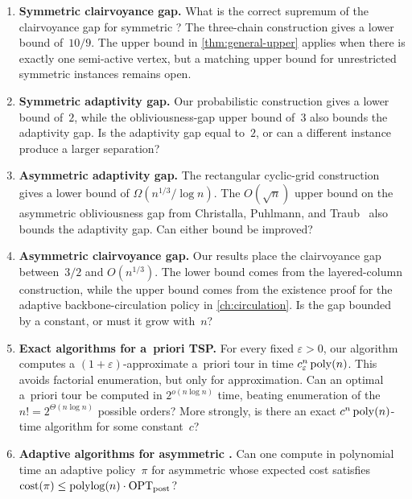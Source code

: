 \documentclass[12pt,a4paper,oneside]{report}
\begin{document}
\begin{enumerate}
    \item \textbf{Symmetric clairvoyance gap.}
    What is the correct supremum of the clairvoyance gap for symmetric \StochTSP{}?
    The three-chain construction gives a lower bound
    of~$10/9$.  The upper bound in \cref{thm:general-upper} applies when
    there is exactly one semi-active vertex, but a matching upper bound for
    unrestricted symmetric instances remains open.

    \item \textbf{Symmetric adaptivity gap.}
    Our probabilistic construction gives a lower bound of~$2$, while the
    obliviousness-gap upper bound of~$3$ also bounds the adaptivity gap.
    Is the adaptivity gap equal to~$2$, or can a different instance produce
    a larger separation?

    \item \textbf{Asymmetric adaptivity gap.}
    The rectangular cyclic-grid construction gives a lower bound of
    $\Omega(n^{1/3}/\log n)$.  The $O(\sqrt n)$ upper bound on the
    asymmetric obliviousness gap from Christalla, Puhlmann, and
    Traub~\cite{Christalla2025} also bounds the adaptivity gap.  Can either
    bound be improved?

    \item \textbf{Asymmetric clairvoyance gap.}
    Our results place the clairvoyance gap between~$3/2$ and
    $O(n^{1/3})$.  The lower bound comes from the layered-column construction,
    while the upper bound comes from the existence proof for the adaptive
    backbone-circulation policy in \cref{ch:circulation}.  Is the gap bounded
    by a constant, or must it grow with~$n$?

    \item \textbf{Exact algorithms for a~priori TSP.}
    For every fixed $\varepsilon>0$, our algorithm computes a
    $(1{+}\varepsilon)$-approximate a~priori tour in time
    $c_\varepsilon^n\operatorname{poly}(n)$.  This avoids factorial enumeration, but only
    for approximation.  Can an optimal a~priori tour be computed in
    $2^{o(n\log n)}$ time, beating enumeration of the
    $n! = 2^{\Theta(n\log n)}$ possible orders?  More strongly, is there an
    exact $c^n\operatorname{poly}(n)$-time algorithm for some constant~$c$?

    \item \textbf{Adaptive algorithms for asymmetric \StochTSP{}.}
    Can one compute in polynomial time an adaptive policy~$\pi$ for
    asymmetric \StochTSP{} whose expected cost satisfies
    $\operatorname{cost}(\pi)\le\operatorname{polylog}(n)\cdot\operatorname{OPT}_\mathrm{post}$?
\end{enumerate}
\end{document}
